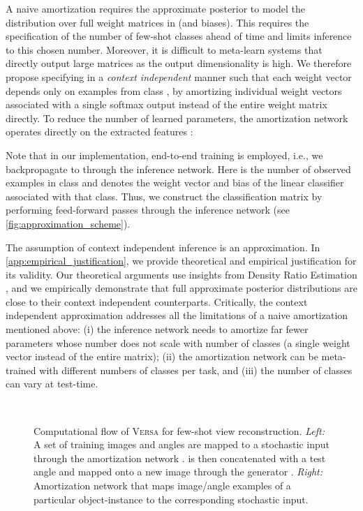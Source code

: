 \documentclass{article}
\newcommand{\Versa}{\textsc{Versa}}
\begin{document}
A naive amortization requires the approximate posterior  to model the distribution over full weight matrices in  (and biases). This requires the specification of the number of few-shot classes  ahead of time and limits inference to this chosen number. 
Moreover, it is difficult to meta-learn systems that directly output large matrices as the output dimensionality is high. We therefore propose specifying  in a \textit{context independent} manner such that each weight vector  depends only on examples from class , by amortizing individual weight vectors associated with a single softmax output instead of the entire weight matrix directly. To reduce the number of learned parameters, the amortization network operates directly on the extracted features :

Note that in our implementation, end-to-end training is employed, i.e., we backpropagate to  through the inference network. Here  is the number of observed examples in class  and  denotes the weight vector and bias of the linear classifier associated with that class. Thus, we construct the classification matrix  by performing  feed-forward passes through the inference network  (see \cref{fig:approximation_scheme}). 

The assumption of context independent inference is an approximation. In \cref{app:empirical_justification}, we provide theoretical and empirical justification for its validity. Our theoretical arguments use insights from Density Ratio Estimation \citep{mohamed2018blog, sugiyama2012density}, and we empirically demonstrate that full approximate posterior distributions are close to their context independent counterparts. Critically, the context independent approximation addresses all the limitations of a naive amortization mentioned above: (i) the inference network needs to amortize far fewer parameters whose number does not scale with number of classes  (a single weight vector instead of the entire matrix); (ii) the amortization network can be meta-trained with different numbers of classes per task, and (iii) the number of classes  can vary at test-time.
\begin{figure}[t] 
	\centering
 \\
	\caption{Computational flow of \Versa{} for few-shot view reconstruction. \textit{Left:} A set of training images and angles  are mapped to a stochastic input  through the amortization network .  is then concatenated with a test angle  and mapped onto a new image through the generator . \textit{Right:} Amortization network that maps  image/angle examples of a particular object-instance to the corresponding stochastic input.}
\label{fig:approximation_scheme_shapenet}
\end{figure}
\end{document}

